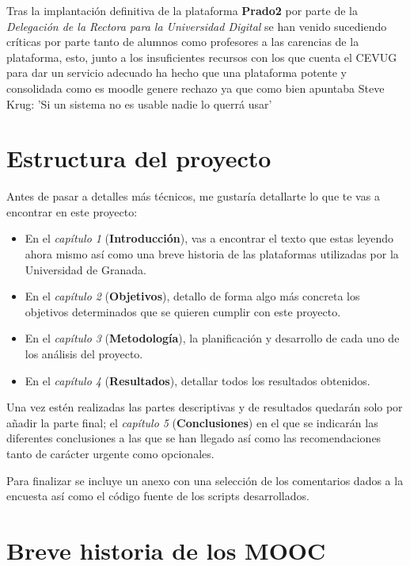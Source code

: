 \bigskip
Tras la implantación definitiva de la plataforma \textbf{Prado2} por parte de la \textit{Delegación de la Rectora para la Universidad Digital} se han venido sucediendo críticas por parte tanto de alumnos como profesores a las carencias de la plataforma, esto, junto a los insuficientes recursos con los que cuenta el CEVUG para dar un servicio adecuado ha hecho que una plataforma potente y consolidada como es moodle genere rechazo ya que como bien apuntaba Steve Krug: 'Si un sistema no es usable nadie lo querrá usar' \cite{stevekrug}


\section{Estructura del proyecto}


\bigskip
Antes de pasar a detalles más técnicos, me gustaría detallarte lo que te vas a encontrar en este proyecto:

\begin{itemize}
  \item En el \textit{capítulo 1} (\textbf{Introducción}), vas a encontrar el texto que estas leyendo ahora mismo así como una breve historia de las plataformas utilizadas por la Universidad de Granada.
  \item En el \textit{capítulo 2} (\textbf{Objetivos}), detallo de forma algo más concreta los objetivos determinados que se quieren cumplir con este proyecto.
  \item En el \textit{capítulo 3} (\textbf{Metodología}), la planificación y desarrollo de cada uno de los análisis del proyecto.
  \item En el \textit{capítulo 4} (\textbf{Resultados}), detallar todos los resultados obtenidos.
\end{itemize}

\bigskip
Una vez estén realizadas las partes descriptivas y de resultados quedarán solo por añadir la parte final; el \textit{capítulo 5} (\textbf{Conclusiones}) en el que se indicarán las diferentes conclusiones a las que se han llegado así como las recomendaciones tanto de carácter urgente como opcionales.

\bigskip
Para finalizar se incluye un anexo con una selección de los comentarios dados a la encuesta así como el código fuente de los scripts desarrollados.

\section{Breve historia de los MOOC}

